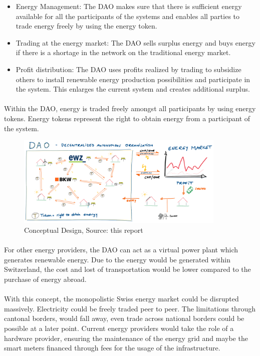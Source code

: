 \documentclass{scrartcl}
\begin{document}
	\begin{itemize}
		\item Energy Management: The DAO makes sure that there is sufficient energy available for all the participants of the systems and enables all parties to trade energy freely by using the energy token.
		\item Trading at the energy market: The DAO sells surplus energy and buys energy if there is a shortage in the network on the traditional energy market.
		\item Profit distribution: The DAO uses profits realized by trading to subsidize others to install renewable energy production possibilities and participate in the system. This enlarges the current system and creates additional surplus.
	\end{itemize}

	\paragraph{}
	Within the DAO, energy is traded freely amongst all participants by using energy tokens. Energy tokens represent the right to obtain energy from a participant of the system.
    
    \begin{figure} [h]
    	\centering
    	\includegraphics[width=100mm,scale=0.5]{03_conceptual_design_picture01.PNG}
    	\caption{Conceptual Design, Source: this report}
    \end{figure}
    
    \paragraph{}
    For other energy providers, the DAO can act as a virtual power plant which generates renewable energy. Due to the energy would be generated within Switzerland, the cost and lost of transportation would be lower compared to the purchase of energy abroad.
    
     \paragraph{}
     With this concept, the monopolistic Swiss energy market could be disrupted massively. Electricity could be freely traded peer to peer. The limitations through cantonal borders, would fall away, even trade across national borders could be possible at a later point. Current energy providers would take the role of a hardware provider, ensuring the maintenance of the energy grid and maybe the smart meters financed through fees for the usage of the infrastructure.
     
\end{document}
